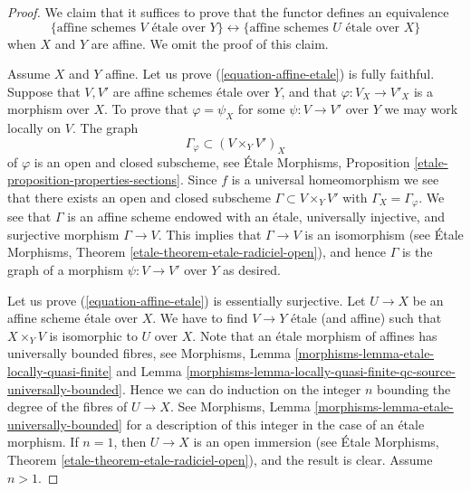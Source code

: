\begin{proof}
We claim that it suffices to prove that the functor defines
an equivalence
\begin{equation}
\label{equation-affine-etale}
\{
\text{affine schemes }V\text{ \'etale over }Y
\}
\leftrightarrow
\{
\text{affine schemes }U\text{ \'etale over }X
\}
\end{equation}
when $X$ and $Y$ are affine. We omit the proof of this claim.

\medskip\noindent
Assume $X$ and $Y$ affine.
Let us prove (\ref{equation-affine-etale}) is fully faithful. Suppose that
$V, V'$ are affine schemes \'etale over $Y$, and that $\varphi : V_X \to V'_X$
is a morphism over $X$. To prove that $\varphi = \psi_X$ for some
$\psi : V \to V'$ over $Y$ we may work locally on $V$. The graph
$$
\Gamma_\varphi \subset (V \times_Y V')_X
$$
of $\varphi$ is an open and closed subscheme, see
\'Etale Morphisms, Proposition \ref{etale-proposition-properties-sections}.
Since $f$ is a universal homeomorphism we see that there exists an
open and closed subscheme $\Gamma \subset V \times_Y V'$ with
$\Gamma_X = \Gamma_\varphi$. We see that $\Gamma$ is an affine scheme
endowed with an \'etale, universally injective, and surjective morphism
$\Gamma \to V$. This implies that $\Gamma \to V$ is an isomorphism (see
\'Etale Morphisms, Theorem \ref{etale-theorem-etale-radiciel-open}),
and hence $\Gamma$ is the graph of a morphism $\psi : V \to V'$ over $Y$
as desired.

\medskip\noindent
Let us prove (\ref{equation-affine-etale}) is essentially surjective.
Let $U \to X$ be an affine scheme \'etale over $X$.
We have to find $V \to Y$ \'etale (and affine) such that $X \times_Y V$
is isomorphic to $U$ over $X$. Note that an \'etale morphism of affines
has universally bounded fibres, see
Morphisms,
Lemma \ref{morphisms-lemma-etale-locally-quasi-finite} and
Lemma \ref{morphisms-lemma-locally-quasi-finite-qc-source-universally-bounded}.
Hence we can do induction on the integer $n$ bounding the degree of the fibres
of $U \to X$. See
Morphisms, Lemma \ref{morphisms-lemma-etale-universally-bounded}
for a description of this integer in the case of an \'etale morphism.
If $n = 1$, then $U \to X$ is an open immersion (see
\'Etale Morphisms, Theorem \ref{etale-theorem-etale-radiciel-open}),
and the result is clear. Assume $n > 1$.


\end{proof}
